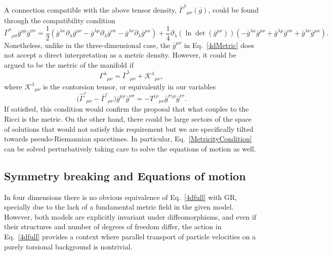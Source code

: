 \documentclass[twocolumn,aps,
  showpacs,showkeys,prd,superscriptaddress]{revtex4-1}
\begin{document}
A connection compatible with the above tensor density,   $\bar\Gamma^{\lambda}{}_{\mu\nu}(\bar{g})$, could be found through the compatibility condition
\begin{dmath*}
  \bar{\Gamma}^{\kappa}{}_{\rho\sigma}\bar{g}^{\rho\mu}\bar{g}^{\sigma\nu} = \frac{1}{2} (\bar{g}^{\lambda\kappa}\partial_\lambda\bar{g}^{\mu\nu} -\bar{g}^{\lambda\mu}\partial_\lambda\bar{g}^{\nu\kappa} -\bar{g}^{\lambda\nu}\partial_\lambda\bar{g}^{\mu\kappa}) + \frac{1}{4}\partial_\lambda (\ln\det(\bar{g}^{\mu\nu})) (-\bar{g}^{\lambda\kappa}\bar{g}^{\mu\nu} +\bar{g}^{\lambda\mu}\bar{g}^{\nu\kappa} +\bar{g}^{\lambda\nu}\bar{g}^{\mu\kappa}).
\end{dmath*}
Nonetheless, unlike in the three-dimensional case, the $\bar{g}^{\mu\nu}$ in Eq.~\eqref{4dMetric} does not accept a direct interpretation as a metric density. However, it could be argued to be the metric of the manifold if
$$\Gamma^\lambda{}_{\mu\nu} = \bar{\Gamma}^\lambda{}_{\mu\nu}+\mathcal{K}^\lambda{}_{\mu\nu},$$
where $\mathcal{K}^\lambda{}_{\mu\nu}$ is the contorsion tensor, or equivalently in our variables
\begin{dmath}
  \label{MetricityCondition}
  \Big(\hat{\Gamma}^{\tau}{}_{\mu\nu}-\bar{\Gamma}^{\tau}{}_{\mu\nu}\Big)\bar{g}^{\mu\rho}\bar{g}^{\nu\sigma} =
  -T^{(\rho}{}_{\mu\nu}\bar{g}^{\sigma)\mu}\bar{g}^{\nu\tau}	.
\end{dmath} 
If satisfied, this condition would confirm the proposal that what couples to the Ricci is the metric. On the other hand, there could be large sectors of the space of solutions that would not satisfy this requirement but we are specifically tilted towards pseudo-Riemannian spacetimes. In particular, Eq.~\eqref{MetricityCondition} can be solved perturbatively taking care to solve the equations of motion as well.



\subsection*{Symmetry breaking and Equations of motion }

In four dimensions there is no obvious equivalence of Eq.~\eqref{4dfull} with GR, specially due to the lack of a fundamental metric field in the given model. However, both models are explicitly invariant under diffeomorphisms, and even if their structures and number of degrees of freedom differ, the action in Eq.~\eqref{4dfull} provides a context where parallel transport of particle velocities on a purely torsional background is nontrivial.
\end{document}
